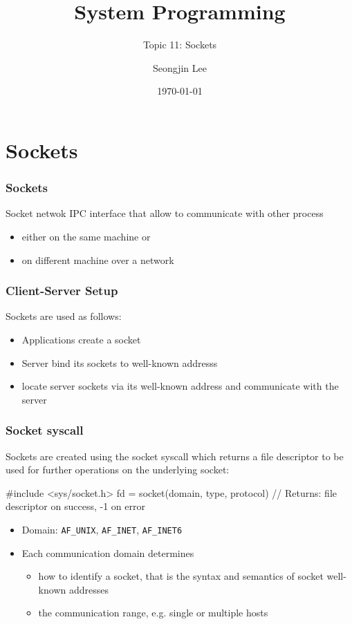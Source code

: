 \documentclass[newPxFont,sthlmFooter,nooffset]{beamer}
\title{System Programming}
\subtitle{Topic 11: Sockets}
\author[SJL]{Seongjin Lee}
\institute{\href{mailto:insight@gnu.ac.kr}{insight@gnu.ac.kr}\\\url{http://open.gnu.ac.kr}\\Systems Research Lab.\\Gyeongsang National University}
\date{\today}
\begin{document}
\frame[plain]{\titlepage}




\section{Sockets}

\begin{frame}[t, fragile]
  \frametitle{Sockets}
Socket netwok IPC interface that allow to communicate with other process
\begin{itemize}
\item either on the same machine or
\item on different machine over a network
\end{itemize}
\end{frame}


\begin{frame}[t, fragile]
  \frametitle{Client-Server Setup}
Sockets are used as follows:
\begin{itemize}
\item Applications create a socket
\item Server bind its sockets to well-known addresss
\item locate server sockets via its well-known address and communicate with the server
\end{itemize}


\end{frame}


\begin{frame}[t, fragile]
  \frametitle{Socket syscall}
Sockets are created using the socket syscall which returns a file descriptor to be used for further operations on the underlying socket:

\begin{codedef}
#include <sys/socket.h>
fd = socket(domain, type, protocol)
// Returns: file descriptor on success, -1 on error
\end{codedef}


\begin{itemize}
\item Domain: \texttt{AF\_UNIX}, \texttt{AF\_INET}, \texttt{AF\_INET6}
\item Each communication domain determines
  \begin{itemize}
  \item how to identify a socket, that is the syntax and semantics of socket well-known addresses
  \item the communication range, e.g. single or multiple hosts
  \end{itemize}
\end{itemize}

\end{frame}
\end{document}
